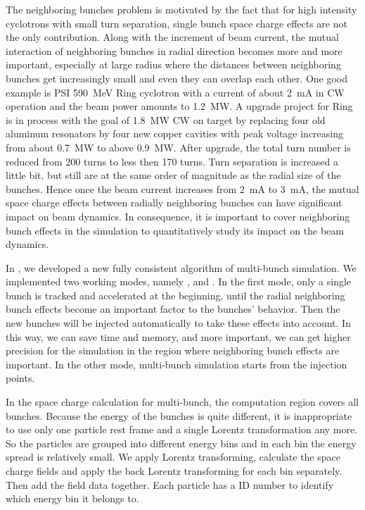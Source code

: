 The neighboring bunches problem is motivated by the fact that for high intensity cyclotrons with small turn
separation, single bunch space charge effects are not the only contribution. Along with the increment of beam
current, the mutual interaction of neighboring bunches in radial direction becomes more and more important,
especially at large radius where the distances between neighboring bunches get increasingly small and even they
can overlap each other. One good example is PSI \SI{590}{\mega\electronvolt} Ring cyclotron with a current of about \SI{2}{\milli\ampere} in
CW operation and the beam power amounts to \SI{1.2}{\mega\watt}. A upgrade project for Ring is in process with
the goal of \SI{1.8}{\mega\watt} CW on target by replacing four old aluminum resonators by four new copper cavities with peak
voltage increasing from about \SI{0.7}{\mega\watt} to above \SI{0.9}{\mega\watt}. After upgrade, the total turn
number is reduced from 200 turns to less then 170 turns.
Turn separation is increased a little bit, but still are at the same order
of magnitude as the radial size of the bunches. Hence once the beam current increases from \SI{2}{\milli\ampere} to \SI{3}{\milli\ampere}, the mutual space
charge effects between radially neighboring bunches can have significant impact on beam dynamics.
In consequence, it is important to cover neighboring bunch effects in the simulation to quantitatively study its impact on the beam dynamics.

In \opalcycl, we developed a new fully consistent algorithm of multi-bunch simulation.  We implemented two working modes, namely ,
 and . In the first mode, only a single bunch is tracked and accelerated at the beginning,
until the radial neighboring bunch effects become an important factor to the bunches' behavior. Then the new bunches will be injected automatically to take these effects into account. In this way, we can save time and memory, and more important,
we can get higher precision for the simulation in the region where neighboring bunch effects are important.
In the other mode, multi-bunch simulation starts from the injection points.

In the space charge calculation for multi-bunch, the computation region covers all bunches.
Because the energy of the bunches is quite different, it is inappropriate to use only one particle rest frame and a single Lorentz transformation any more.
So the particles are grouped into different energy bins and in each bin the energy spread is relatively small. We apply Lorentz transforming, calculate
the space charge fields and apply the back Lorentz transforming for each bin separately. Then add the field data together. Each particle has a ID number to identify
which energy bin it belongs to.



